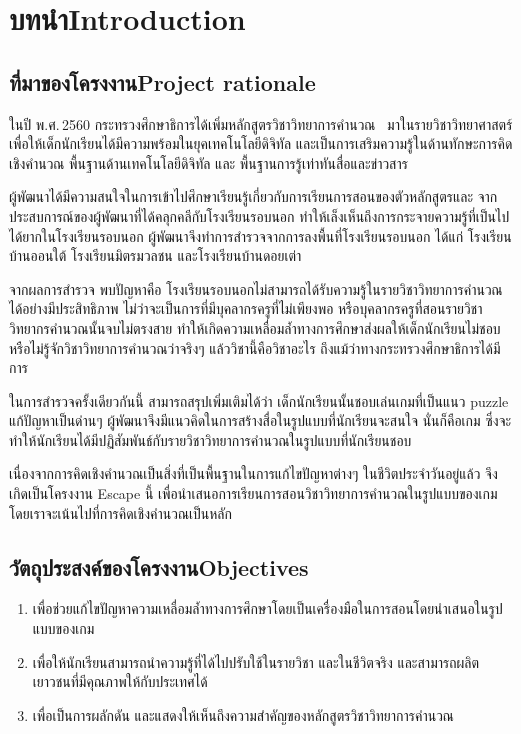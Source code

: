 \chapter{\ifcpe บทนำ\else Introduction\fi}

\section{\ifcpe ที่มาของโครงงาน\else Project rationale\fi}
ในปี พ.ศ.\,2560 กระทรวงศึกษาธิการได้เพิ่มหลักสูตรวิชาวิทยาการคำนวณ~\cite{cpc} มาในรายวิชาวิทยาศาสตร์
 เพื่อให้เด็กนักเรียนได้มีความพร้อมในยุคเทคโนโลยีดิจิทัล 
และเป็นการเสริมความรู้ในด้านทักษะการคิดเชิงคำนวณ 
พื้นฐานด้านเทคโนโลยีดิจิทัล และ พื้นฐานการรู้เท่าทันสื่อและข่าวสาร

ผู้พัฒนาได้มีความสนใจในการเข้าไปศึกษาเรียนรู้เกี่ยวกับการเรียนการสอนของตัวหลักสูตรและ
จากประสบการณ์ของผู้พัฒนาที่ได้คลุกคลีกับโรงเรียนรอบนอก
ทำให้เล็งเห็นถึงการกระจายความรู้ที่เป็นไปได้ยากในโรงเรียนรอบนอก ผู้พัฒนาจึงทำการสำรวจจากการลงพื้นที่โรงเรียนรอบนอก
 ได้แก่ โรงเรียนบ้านออนใต้ โรงเรียนมิตรมวลชน และโรงเรียนบ้านดอยเต่า

จากผลการสำรวจ พบปัญหาคือ โรงเรียนรอบนอกไม่สามารถได้รับความรู้ในรายวิชาวิทยาการคำนวณได้อย่างมีประสิทธิภาพ 
ไม่ว่าจะเป็นการที่มีบุคลากรครูที่ไม่เพียงพอ หรือบุคลากรครูที่สอนรายวิชาวิทยากรคำนวณนั้นจบไม่ตรงสาย 
ทำให้เกิดความเหลื่อมล้ำทางการศึกษาส่งผลให้เด็กนักเรียนไม่ชอบ หรือไม่รู้จักวิชาวิทยาการคำนวณว่าจริงๆ 
แล้ววิชานี้คือวิชาอะไร ถึงแม้ว่าทางกระทรวงศึกษาธิการได้มีการ

ในการสำรวจครั้งเดียวกันนี้ สามารถสรุปเพิ่มเติมได้ว่า เด็กนักเรียนนั้นชอบเล่นเกมที่เป็นแนว puzzle แก้ปัญหาเป็นด่านๆ ผู้พัฒนาจึงมีแนวคิดในการสร้างสื่อในรูปแบบที่นักเรียนจะสนใจ นั่นก็คือเกม
ซึ่งจะทำให้นักเรียนได้มีปฏิสัมพันธ์กับรายวิชาวิทยาการคำนวณในรูปแบบที่นักเรียนชอบ

เนื่องจากการคิดเชิงคำนวณเป็นสิ่งที่เป็นพื้นฐานในการแก้ไขปัญหาต่างๆ ในชีวิตประจำวันอยู่แล้ว จึงเกิดเป็นโครงงาน Escape นี้ เพื่อนำเสนอการเรียนการสอนวิชาวิทยาการคำนวณในรูปแบบของเกม
โดยเราจะเน้นไปที่การคิดเชิงคำนวณเป็นหลัก

\section{\ifcpe วัตถุประสงค์ของโครงงาน\else Objectives\fi}
\begin{enumerate}
    \item เพื่อช่วยแก้ไขปัญหาความเหลื่อมล้ำทางการศึกษาโดยเป็นเครื่องมือในการสอนโดยนำเสนอในรูปแบบของเกม
    \item เพื่อให้นักเรียนสามารถนำความรู้ที่ได้ไปปรับใช้ในรายวิชา และในชีวิตจริง และสามารถผลิตเยาวชนที่มีคุณภาพให้กับประเทศได้
    \item เพื่อเป็นการผลักดัน และแสดงให้เห็นถึงความสำคัญของหลักสูตรวิชาวิทยาการคำนวณ
\end{enumerate}

